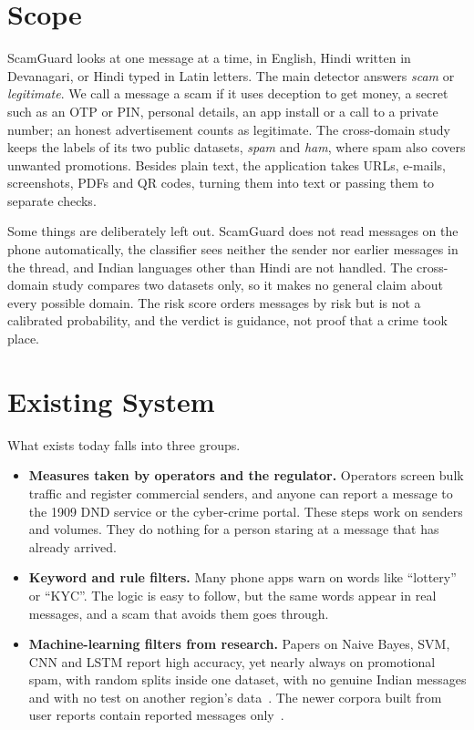 \section{Scope}
ScamGuard looks at one message at a time, in English, Hindi written in Devanagari, or Hindi typed in Latin letters. The main detector answers \emph{scam} or \emph{legitimate}. We call a message a scam if it uses deception to get money, a secret such as an OTP or PIN, personal details, an app install or a call to a private number; an honest advertisement counts as legitimate. The cross-domain study keeps the labels of its two public datasets, \emph{spam} and \emph{ham}, where spam also covers unwanted promotions. Besides plain text, the application takes URLs, e-mails, screenshots, PDFs and QR codes, turning them into text or passing them to separate checks.

Some things are deliberately left out. ScamGuard does not read messages on the phone automatically, the classifier sees neither the sender nor earlier messages in the thread, and Indian languages other than Hindi are not handled. The cross-domain study compares two datasets only, so it makes no general claim about every possible domain. The risk score orders messages by risk but is not a calibrated probability, and the verdict is guidance, not proof that a crime took place.

\section{Existing System}
What exists today falls into three groups.
\begin{itemize}
\item \textbf{Measures taken by operators and the regulator.} Operators screen bulk traffic and register commercial senders, and anyone can report a message to the 1909 DND service or the cyber-crime portal. These steps work on senders and volumes. They do nothing for a person staring at a message that has already arrived.
\item \textbf{Keyword and rule filters.} Many phone apps warn on words like ``lottery'' or ``KYC''. The logic is easy to follow, but the same words appear in real messages, and a scam that avoids them goes through.
\item \textbf{Machine-learning filters from research.} Papers on Naive Bayes, SVM, CNN and LSTM report high accuracy, yet nearly always on promotional spam, with random splits inside one dataset, with no genuine Indian messages and with no test on another region's data~\cite{almeida2013towards,roy2020deep,goel2024ml}. The newer corpora built from user reports contain reported messages only~\cite{timko2024smishing,agarwal2025fishing}.
\end{itemize}

